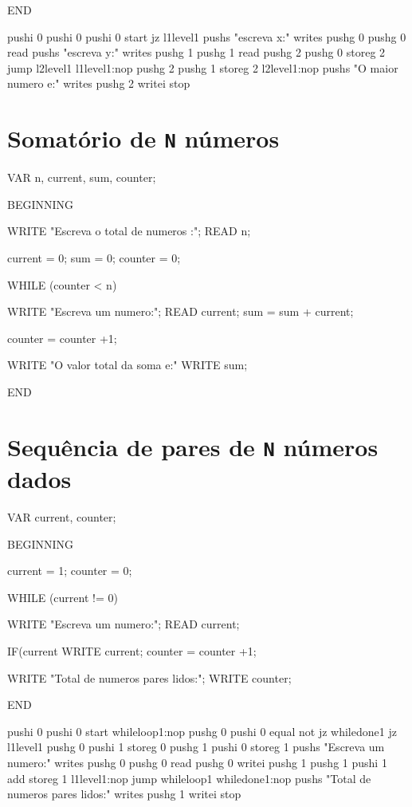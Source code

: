 END



pushi 0
pushi 0
pushi 0
start
jz l1level1	
pushs "escreva x:"
writes
pushg 0
pushg 0
read
pushs "escreva y:"
writes
pushg 1
pushg 1
read
pushg 2
pushg 0
storeg 2
jump l2level1
l1level1:nop
pushg 2
pushg 1
storeg 2
l2level1:nop
pushs "O maior numero e:"
writes
pushg 2
writei
stop


\section{Somatório de \texttt{N} números}
\label{appendix:d:sec:d2}
VAR n, current, sum, counter;

BEGINNING 

	WRITE "Escreva o total de numeros :";
	READ n;

	current = 0;
	sum = 0;
	counter = 0;

	WHILE (counter < n)
	{
	WRITE "Escreva um numero:";
	READ current;
	sum = sum + current;

	counter = counter +1;
	
	}
	WRITE "O valor total da soma e:"
	WRITE sum;

END




\section{Sequência de pares de \texttt{N} números dados}
\label{appendix:d:sec:d3}
VAR current, counter;

BEGINNING

	current = 1;
	counter = 0;


	WHILE (current != 0)
	{

	WRITE "Escreva um numero:";
	READ current;

	  IF(current %
	  {
	   WRITE current;
	   counter = counter +1;
	  }




	}

	WRITE "Total de numeros pares lidos:";
	WRITE counter;

END



pushi 0
pushi 0
start
whileloop1:nop
pushg 0
pushi 0
equal
not
jz whiledone1
jz l1level1	
pushg 0
pushi 1
storeg 0
pushg 1
pushi 0
storeg 1
pushs "Escreva um numero:"
writes
pushg 0
pushg 0
read
pushg 0
writei
pushg 1
pushg 1
pushi 1
add  
storeg 1
l1level1:nop
jump whileloop1
whiledone1:nop
pushs "Total de numeros pares lidos:"
writes
pushg 1
writei
stop


